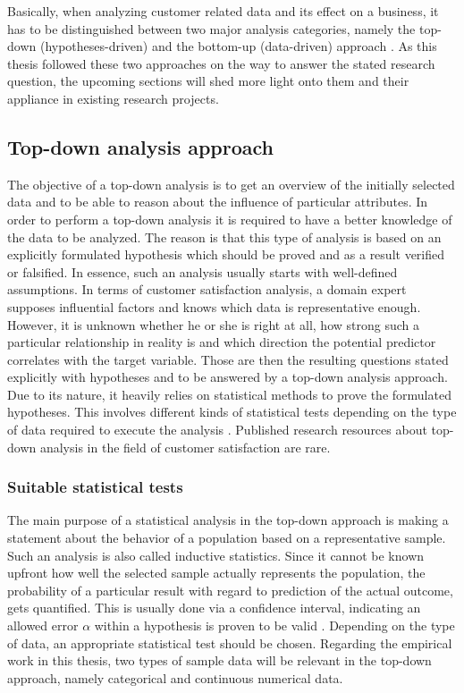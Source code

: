 Basically, when analyzing customer related data and its effect on a business, it has to be distinguished between two major analysis categories, namely the top-down (hypotheses-driven) and the bottom-up (data-driven) approach \cite{neckel2015}. As this thesis followed these two approaches on the way to answer the stated research question, the upcoming sections will shed more light onto them and their appliance in existing research projects.

\subsection{Top-down analysis approach}
\label{ssec:topDown}
The objective of a top-down analysis is to get an overview of the initially selected data and to be able to reason about the influence of particular attributes. In order to perform a top-down analysis it is required to have a better knowledge of the data to be analyzed. The reason is that this type of analysis is based on an explicitly formulated hypothesis which should be proved and as a result verified or falsified. In essence, such an analysis usually starts with well-defined assumptions. In terms of customer satisfaction analysis, a domain expert supposes influential factors and knows which data is representative enough. However, it is unknown whether he or she is right at all, how strong such a particular relationship in reality is and which direction the potential predictor correlates with the target variable. Those are then the resulting questions stated explicitly with hypotheses and to be answered by a top-down analysis approach. Due to its nature, it heavily relies on statistical methods to prove the formulated hypotheses. This involves different kinds of statistical tests depending on the type of data required to execute the analysis \cite{neckel2015}. Published research resources about top-down analysis in the field of customer satisfaction are rare.

\subsubsection{Suitable statistical tests}
The main purpose of a statistical analysis in the top-down approach is making a statement about the behavior of a population based on a representative sample. Such an analysis is also called inductive statistics. Since it cannot be known upfront how well the selected sample actually represents the population, the probability of a particular result with regard to prediction of the actual outcome, gets quantified. This is usually done via a confidence interval, indicating an allowed error $\alpha$ within a hypothesis is proven to be valid \cite{oestreich2009keine}. Depending on the type of data, an appropriate statistical test should be chosen. Regarding the empirical work in this thesis, two types of sample data will be relevant in the top-down approach, namely categorical and continuous numerical data. 

